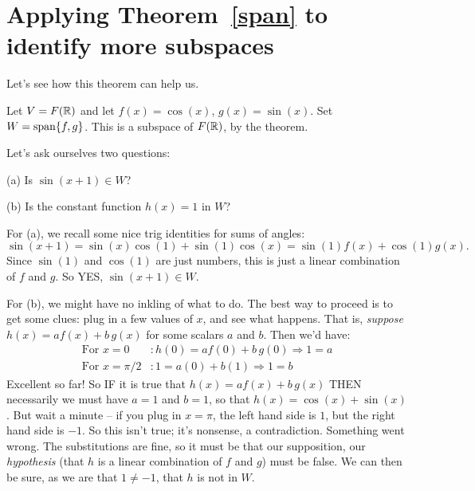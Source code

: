 
\section{Applying Theorem~\ref{span} to identify more subspaces}

Let's see how this theorem can help us.

\begin{myprob} Let $V = F(\mathbb{R})$ and let $f(x) = \cos(x)$, $g(x) = \sin(x)$.
Set $W = \textrm{span}\{f,g\}$.  This is a subspace of $F(\mathbb{R})$, by the theorem.

Let's ask ourselves two questions:

(a) Is $\sin(x+1) \in W$?  

(b) Is the constant function $h(x) = 1$ in $W$?

\begin{mysol} For (a), we   recall some nice trig identities for sums of
angles:
$$
\sin(x+1) = \sin(x) \cos(1) + \sin(1) \cos(x) = \sin(1) f(x) + \cos(1) g(x).
$$
Since $\sin(1)$ and $\cos(1)$ are just numbers, this is just a linear
combination of $f$ and $g$. So YES, $\sin(x+1)\in W$.

For (b), we might have no inkling of what to do.  The best way to proceed is to get some
clues:  plug in a few values of $x$, and see what happens.  That is,
{\it suppose} $h(x) = a f(x) + b\, g(x)$ for some scalars $a$ and $b$.  Then we'd have:
\begin{align*}
\text{For }x = 0&:  h(0) = af(0) + b\,g(0) \Rightarrow 1 = a\\
\text{For }x=\pi/2 &: 1 = a(0) + b(1) \Rightarrow 1=b
\end{align*}
Excellent so far!  So IF it is true that $h(x) = a f(x) + b\, g(x)$ THEN 
necessarily we must have $a=1$ and $b=1$, so that
$h(x) = \cos(x) + \sin(x)$.  
But wait a minute -- if you plug in $x=\pi$, the left hand side
is $1$, but the right hand side is $-1$.  So this isn't
true; it's nonsense, a contradiction. Something went wrong. The substitutions are fine, so it must be that our supposition,  our {\it hypothesis} (that $h$
is a linear combination of $f$ and $g$) must be false.  We can then be sure, as we are that $1\not=-1$, that $h$ is not in $W$.
\end{mysol}\end{myprob}

